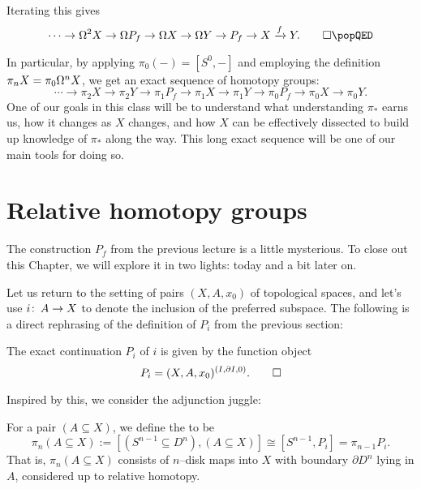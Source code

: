 \begin{lemma}\label{LexseqInvolvingP}\pushQED{\qed}%
Iterating this gives \[\cdots \to \Loops^2 X \to \Loops P_f \to \Loops X \to \Loops Y \to P_f \to X \xrightarrow f Y. \qedhere \popQED\]
\end{lemma}

In particular, by applying $\pi_0(-) = [S^0, -]$ and employing the definition $\pi_n X = \pi_0 \Omega^n X$, we get an exact sequence of homotopy groups: \[\cdots \to \pi_2 X \to \pi_2 Y \to \pi_1 P_f \to \pi_1 X \to \pi_1 Y \to \pi_0 P_f \to \pi_0 X \to \pi_0 Y.\]
One of our goals in this class will be to understand what understanding $\pi_*$ earns us, how it changes as $X$ changes, and how $X$ can be effectively dissected to build up knowledge of $\pi_*$ along the way.
This long exact sequence will be one of our main tools for doing so.




\section{Relative homotopy groups}

The construction $P_f$ from the previous lecture is a little mysterious.
To close out this Chapter, we will explore it in two lights: today and a bit later on.

Let us return to the setting of pairs $(X, A, x_0)$ of topological spaces, and let's use $i\colon\thinspace A \to X$ to denote the inclusion of the preferred subspace.
The following is a direct rephrasing of the definition of $P_i$ from the previous section:

\begin{lemma}
The exact continuation $P_i$ of $i$ is given by the function object \[P_i = (X, A, x_0)^{(I, \partial I, 0)}. \qed\]
\end{lemma}

\noindent
Inspired by this, we consider the adjunction juggle:

\begin{definition}
For a pair $(A \subseteq X)$, we define the  to be \[\pi_n(A \subseteq X) := [(S^{n-1} \subseteq D^n), (A \subseteq X)] \cong [S^{n-1}, P_i] = \pi_{n-1} P_i.\]
That is, $\pi_n(A \subseteq X)$ consists of $n$--disk maps into $X$ with boundary $\partial D^n$ lying in $A$, considered up to relative homotopy.
\end{definition}

